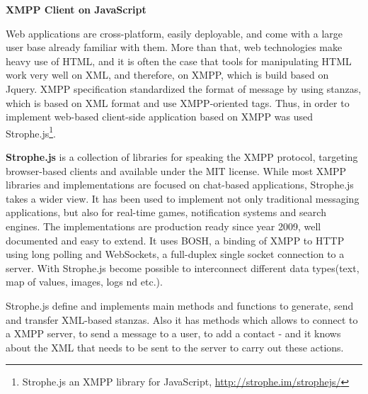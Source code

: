     \textbf{XMPP Client on JavaScript}

	Web applications are cross-platform, easily deployable, and come with a large user base already familiar with them. More than that, web technologies make heavy use of HTML, and it is often the case that tools for manipulating HTML work very well on XML, and therefore, on XMPP, which is build based on Jquery. XMPP specification standardized the format of message by using stanzas, which is based on XML format and use XMPP-oriented tags. Thus, in order to implement web-based client-side application based on XMPP was used Strophe.js\footnote{Strophe.js an XMPP library for JavaScript, \url{http://strophe.im/strophejs/}}.

    \textbf{Strophe.js} is a collection of libraries for speaking the XMPP protocol, targeting browser-based clients and available under the MIT license. While most XMPP libraries and implementations are focused on chat-based applications, Strophe.js takes a wider view. It has been used to implement not only traditional messaging applications, but also for real-time games, notification systems and search engines. The implementations are production ready since year 2009, well documented and easy to extend. It uses BOSH, a binding of XMPP to HTTP using long polling and WebSockets, a full-duplex single socket connection to a server. With Strophe.js become possible to interconnect different data types(text, map of values, images, logs nd etc.).

    Strophe.js define and implements main methods and functions to generate, send and transfer XML-based stanzas. Also it has methods which allows to connect to a XMPP server, to send a message to a user, to add a contact - and it knows about the XML that needs to be sent to the server to carry out these actions. 

